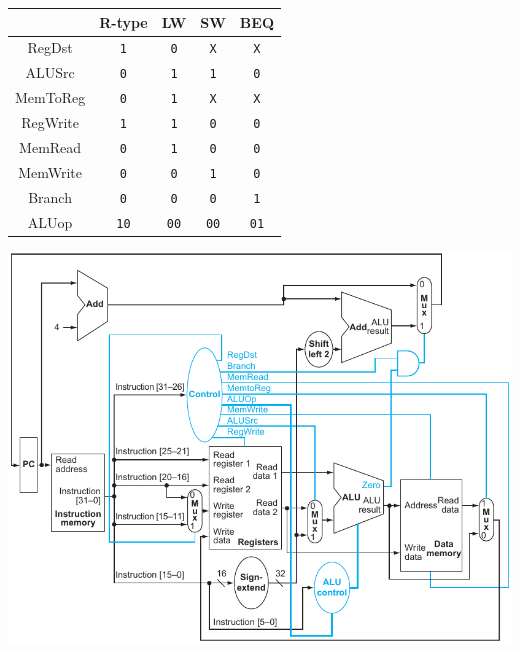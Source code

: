\documentclass[10pt]{article}
\begin{document}
\begin{minipage}[t]{0.36\linewidth}
    \centering
    \begin{tabular}{ccccc}
        \toprule
                 & R-type      & LW          & SW          & BEQ         \\
        \midrule
        RegDst   & \texttt{1}  & \texttt{0}  & \texttt{X}  & \texttt{X}  \\
        ALUSrc   & \texttt{0}  & \texttt{1}  & \texttt{1}  & \texttt{0}  \\
        MemToReg & \texttt{0}  & \texttt{1}  & \texttt{X}  & \texttt{X}  \\
        RegWrite & \texttt{1}  & \texttt{1}  & \texttt{0}  & \texttt{0}  \\
        MemRead  & \texttt{0}  & \texttt{1}  & \texttt{0}  & \texttt{0}  \\
        MemWrite & \texttt{0}  & \texttt{0}  & \texttt{1}  & \texttt{0}  \\
        Branch   & \texttt{0}  & \texttt{0}  & \texttt{0}  & \texttt{1}  \\
        ALUop    & \texttt{10} & \texttt{00} & \texttt{00} & \texttt{01} \\
        \bottomrule
    \end{tabular}
\end{minipage}
\begin{minipage}{0.6\linewidth}
    \includegraphics{content/fig417.pdf}
\end{minipage}

\vfill
\end{document}
